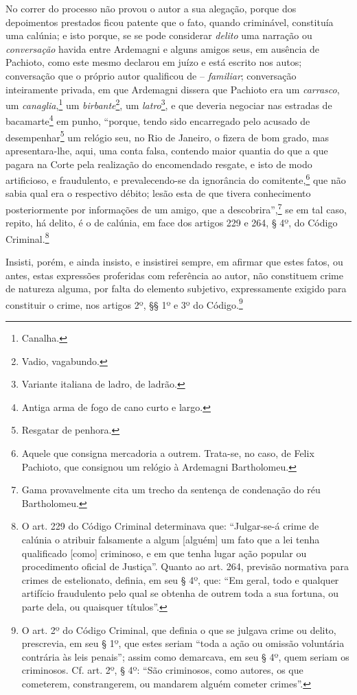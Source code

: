 No correr do processo não provou o autor a sua alegação, porque dos
depoimentos prestados ficou patente que o fato, quando criminável,
constituía uma calúnia; e isto porque, se se pode considerar
\emph{delito} uma narração ou \emph{conversação} havida entre Ardemagni
e alguns amigos seus, em ausência de Pachioto, como este mesmo declarou
em juízo e está escrito nos autos; conversação que o próprio autor
qualificou de -- \emph{familiar}; conversação inteiramente privada, em
que Ardemagni dissera que Pachioto era um \emph{carrasco}, um
\emph{canaglia},\footnote{ Canalha.} um \emph{birbante}\footnote{
  Vadio, vagabundo.}, um \emph{latro}\footnote{ Variante italiana de
  ladro, de ladrão.}, e que deveria negociar nas estradas de
bacamarte\footnote{ Antiga arma de fogo de cano curto e largo.} em
punho, ``porque, tendo sido encarregado pelo acusado de
desempenhar\footnote{ Resgatar de penhora.} um relógio seu, no Rio de
Janeiro, o fizera de bom grado, mas apresentara-lhe, aqui, uma conta
falsa, contendo maior quantia do que a que pagara na Corte pela
realização do encomendado resgate, e isto de modo artificioso, e
fraudulento, e prevalecendo-se da ignorância do comitente,\footnote{
  Aquele que consigna mercadoria a outrem. Trata-se, no caso, de Felix
  Pachioto, que consignou um relógio à Ardemagni Bartholomeu.} que não
sabia qual era o respectivo débito; lesão esta de que tivera
conhecimento posteriormente por informações de um amigo, que a
descobrira'',\footnote{ Gama provavelmente cita um trecho da sentença de
  condenação do réu Bartholomeu.} se em tal caso, repito, há delito, é o
de calúnia, em face dos artigos 229 e 264, § 4º, do Código
Criminal.\footnote{ O art. 229 do Código Criminal determinava que:
  ``Julgar-se-á crime de calúnia o atribuir falsamente a algum
  {[}alguém{]} um fato que a lei tenha qualificado {[}como{]} criminoso,
  e em que tenha lugar ação popular ou procedimento oficial de Justiça''.
  Quanto ao art. 264, previsão normativa para crimes de estelionato,
  definia, em seu § 4º, que: ``Em geral, todo e qualquer artifício
  fraudulento pelo qual se obtenha de outrem toda a sua fortuna, ou
  parte dela, ou quaisquer títulos''.}

Insisti, porém, e ainda insisto, e insistirei sempre, em afirmar que
estes fatos, ou antes, estas expressões proferidas com referência ao
autor, não constituem crime de natureza alguma, por falta do elemento
subjetivo, expressamente exigido para constituir o crime, nos artigos
2º, §§ 1º e 3º do Código.\footnote{ O art. 2º do Código Criminal, que
  definia o que se julgava crime ou delito, prescrevia, em seu § 1º, que
  estes seriam ``toda a ação ou omissão voluntária contrária às leis
  penais''; assim como demarcava, em seu § 4º, quem seriam os criminosos.
  Cf. art. 2º, § 4º: ``São criminosos, como autores, os que cometerem,
  constrangerem, ou mandarem alguém cometer crimes''.}

